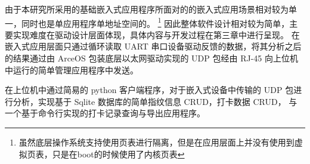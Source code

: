     由于本研究所采用的基础嵌入式应用程序所面对的的嵌入式应用场景相对较为单一，同时也是单应用程序单地址空间的。
    \footnote{虽然底层操作系统支持使用页表进行隔离，但是在应用层面上并没有使用到虚拟页表，只是在boot的时候使用了内核页表}
    因此整体软件设计相对较为简单，主要实现难度在驱动设计层面体现，具体内容与开发过程在第三章中进行呈现。
    在嵌入式应用层面只通过循环读取 UART 串口设备驱动反馈的数据，将其分析之后的结果通过由 ArceOS 包装底层以太网驱动实现的
    UDP 包经由 RJ-45 向上位机中运行的简单管理应用程序中发送。

    在上位机中通过简易的 python 客户端程序，对于嵌入式设备中传输的 UDP 包进行分析，实现基于 Sqlite 数据库的简单指纹信息 CRUD，打卡数据 CRUD，
    与一个基于命令行实现的打卡记录查询与导出应用程序。


